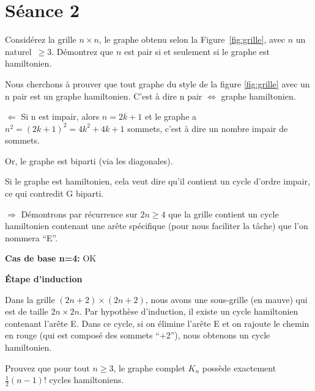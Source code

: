 
\section{Séance 2}

\begin{exo}
Consid\'erez la grille $n \times n$, le graphe obtenu selon la Figure~\ref{fig:grille}, avec $n$ un naturel~$\geq 3$.
D\'emontrez que $n$ est pair si et seulement si le graphe est hamiltonien.
\end{exo}



Nous cherchons à prouver que tout graphe du style de la figure \ref{fig:grille} avec un n pair est un graphe hamiltonien. C'est à dire n pair $\Leftrightarrow$ graphe hamiltonien.

$\Leftarrow$ Si n est impair, alors $n=2k + 1$ et le graphe a $n^2 = (2k + 1)^2 = 4k^2 + 4k + 1$ sommets, c'est à dire un nombre impair de sommets.

Or, le graphe est biparti (via les diagonales).



Si le graphe est hamiltonien, cela veut dire qu'il contient un cycle d'ordre impair, ce qui contredit G biparti.

$\Rightarrow$ Démontrons par récurrence sur $2n \geq 4$ que la grille contient un cycle hamiltonien contenant une arête spécifique (pour nous faciliter la tâche) que l'on nommera ``E''.

\textbf{Cas de base n=4: } OK



\textbf{Étape d'induction}



Dans la grille $(2n+2) \times (2n+2)$, nous avons une sous-grille (en mauve) qui est de taille $2n \times 2n$. Par hypothèse d'induction, il existe un cycle hamiltonien contenant l'arête E. Dans ce cycle, si on élimine l'arête E et on rajoute le chemin en rouge (qui est composé des sommets ``+2''), nous obtenons un cycle hamiltonien.

\newpage

\begin{exo}
Prouvez que pour tout $n \geq 3$, le graphe complet $K_n$ poss\`ede exactement $\frac{1}{2}(n-1)!$ cycles hamiltoniens.
\end{exo}

